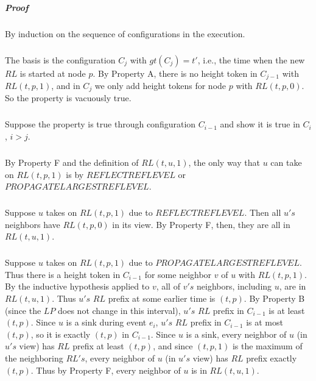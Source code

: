 \subparagraph{Proof} By induction on the sequence of configurations in the execution.
\subparagraph{}The basis is the configuration $C_j$ with $gt(C_j ) = t '$, i.e., the time when the new $RL$ is started at node $p$. By Property A, there is no height token in $C_{j-1}$ with $RL (t, p, 1)$, and in $C_j$ we only add height tokens for node $p$ with $RL (t, p, 0)$. So the property is vacuously true.
\subparagraph{}Suppose the property is true through configuration $C_{i-1}$ and show it is true in $C_i$, $i > j$.
\subparagraph{}By Property F and the definition of $RL (t, u, 1)$, the only way that $u$ can take on $RL (t, p, 1)$ is by $REFLECTREFLEVEL$ or $PROPAGATELARGESTREFLEVEL$.
\subparagraph{}Suppose $u$ takes on $RL (t, p, 1)$ due to $REFLECTREFLEVEL$. Then all $u's$ neighbors have $RL (t, p, 0)$ in its view. By Property F, then, they are all in $RL (t, u, 1)$.
\subparagraph{}Suppose $u$ takes on $RL (t, p, 1)$ due to $PROPAGATELARGESTREFLEVEL$. Thus there is a height token in $C_{i-1}$ for some neighbor $v$ of $u$ with $RL (t, p, 1)$. By the inductive hypothesis applied to $v$, all of $v's$ neighbors, including $u$, are in $RL (t, u, 1)$. Thus $u's$ $RL$ prefix at some earlier time is $(t, p)$. By Property B (since the $LP$ does not change in this interval), $u's$ $RL$ prefix in $C_{i-1}$ is at least $(t, p)$. Since $u$ is a sink during event $e_i$, $u's$ $RL$ prefix in $C_{i-1}$ is at most $(t, p)$, so it is exactly $(t, p)$ in $C_{i-1}$. Since $u$ is a sink, every neighbor of $u$ (in $u's$ view) has $RL$ prefix at least $(t, p)$, and since $(t, p, 1)$ is the maximum of the neighboring $RL's$, every neighbor of $u$ (in $u's$ view) has $RL$ prefix exactly $(t, p)$. Thus by Property F, every neighbor of $u$ is in $RL (t, u, 1)$.

